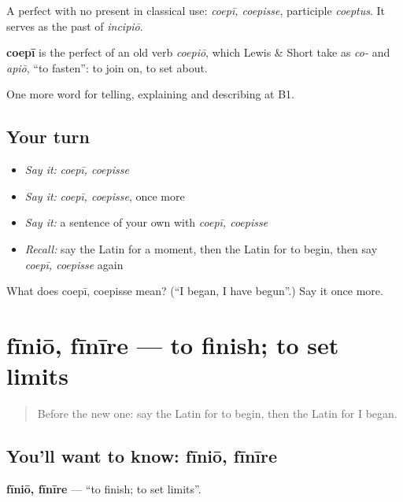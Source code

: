 A perfect with no present in classical use: \emph{coepī, coepisse}, participle \emph{coeptus}. It serves as the past of \emph{incipiō}.

\begin{cousinweb}
\textbf{coepī} is the perfect of an old verb \emph{coepiō}, which Lewis \& Short take as \emph{co-} and \emph{apiō}, \textquotedblleft{}to fasten\textquotedblright{}: to join on, to set about.
\end{cousinweb}

\begin{grammarlens}[title={What you've built}]
One more word for telling, explaining and describing at B1.
\end{grammarlens}

\subsection*{Your turn}
\begin{itemize}
\raggedright
  \item \emph{Say it:} \emph{coepī, coepisse}
  \item \emph{Say it:} \emph{coepī, coepisse}, once more
  \item \emph{Say it:} a sentence of your own with \emph{coepī, coepisse}
  \item \emph{Recall:} say the Latin for a moment, then the Latin for to begin, then say \emph{coepī, coepisse} again
\end{itemize}

\begin{tcolorbox}[breakable,colback=teal!4,colframe=teal!35!black,title={Before you move on}]
What does coepī, coepisse mean? (\textquotedblleft{}I began, I have begun\textquotedblright{}.) Say it once more.
\end{tcolorbox}
\section[fīniō, fīnīre]{fīniō, fīnīre — to finish; to set limits}

\label{lesson:LA-C297-finio}



\begin{quote}
Before the new one: say the Latin for to begin, then the Latin for I began.
\end{quote}

\subsection*{You'll want to know: fīniō, fīnīre}
\textbf{fīniō, fīnīre} — \textquotedblleft{}to finish; to set limits\textquotedblright{}.

